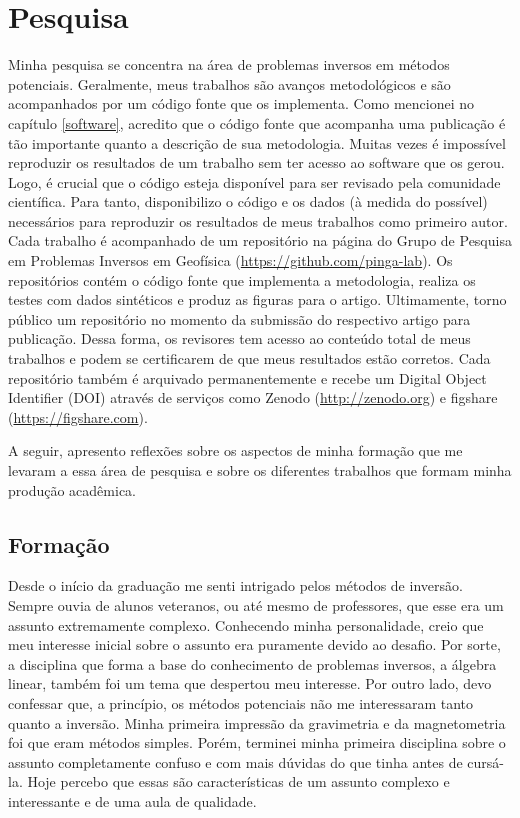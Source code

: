 \section{Pesquisa}

Minha pesquisa se concentra na área de problemas inversos em métodos
potenciais.
Geralmente, meus trabalhos são avanços metodológicos e são acompanhados por
um código fonte que os implementa.
Como mencionei no capítulo \ref{software}, acredito que o código fonte que
acompanha uma publicação é tão importante quanto a descrição de sua
metodologia.
Muitas vezes é impossível reproduzir os resultados de um trabalho
sem ter acesso ao software que os gerou.
Logo, é crucial que o código esteja disponível para ser revisado pela
comunidade científica.
Para tanto, disponibilizo o código e os dados (à medida do possível) necessários
para reproduzir os resultados de meus trabalhos como primeiro autor.
Cada trabalho é acompanhado de um repositório na página do Grupo de Pesquisa em
Problemas Inversos em Geofísica (\url{https://github.com/pinga-lab}).
Os repositórios contém o código fonte que implementa a metodologia, realiza os
testes com dados sintéticos e produz as figuras para o artigo.
Ultimamente, torno público um repositório no momento da submissão do respectivo
artigo para publicação.
Dessa forma, os revisores tem acesso ao conteúdo total de meus trabalhos e
podem se certificarem de que meus resultados estão corretos.
Cada repositório também é arquivado permanentemente e recebe um Digital Object
Identifier (DOI) através de serviços como Zenodo (\url{http://zenodo.org}) e
figshare (\url{https://figshare.com}).

A seguir, apresento reflexões sobre os aspectos de minha formação que me
levaram a essa área de pesquisa e sobre os diferentes trabalhos que formam
minha produção acadêmica.


\subsection{Formação}

Desde o início da graduação me senti intrigado pelos métodos de inversão.
Sempre ouvia de alunos veteranos, ou até mesmo de professores, que esse era um
assunto extremamente complexo.
Conhecendo minha personalidade, creio que meu interesse inicial sobre o assunto
era puramente devido ao desafio.
Por sorte, a disciplina que forma a base do conhecimento de problemas inversos,
a álgebra linear, também foi um tema que despertou meu interesse.
Por outro lado, devo confessar que, a princípio, os métodos potenciais não me
interessaram tanto quanto a inversão.
Minha primeira impressão da gravimetria e da magnetometria foi que eram métodos
simples.
Porém, terminei minha primeira disciplina sobre o assunto completamente confuso
e com mais dúvidas do que tinha antes de cursá-la.
Hoje percebo que essas são características de um assunto complexo e
interessante e de uma aula de qualidade.

